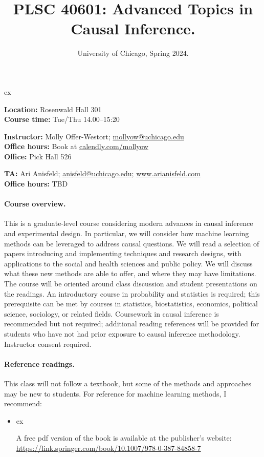 \documentclass[letterpaper, 12pt, parskip=full,DIV=10]{scrartcl}
\title{PLSC 40601: Advanced Topics in Causal Inference.}
\subtitle{University of Chicago, Spring 2024.}
\date{}
\author{}
\begin{document}
\maketitle

 ex

\textbf{Location:} Rosenwald Hall 301\\
\textbf{Course time:} Tue/Thu 14.00--15:20


\textbf{Instructor:} Molly Offer-Westort; \href{mailto:mollyow@uchicago.edu}{mollyow@uchicago.edu}\\
\textbf{Office hours:} Book at \href{https://calendly.com/mollyow}{calendly.com/mollyow}\\
\textbf{Office:} Pick Hall 526 

\textbf{TA:} Ari Anisfeld; \href{mailto:anisfeld@uchicago.edu}{anisfeld@uchicago.edu}; \href{http://www.arianisfeld.com/}{www.arianisfeld.com}\\
\textbf{Office hours:} TBD


\paragraph{Course overview.} This is a graduate-level course considering modern advances in causal inference and experimental design. In particular, we will consider how machine learning methods can be leveraged to address causal questions. We will read a selection of papers introducing and implementing techniques and research designs, with applications to the social and health sciences and public policy. We will discuss what these new methods are able to offer, and where they may have limitations. The course will be oriented around class discussion and student presentations on the readings. An introductory course in probability and statistics is required; this prerequisite can be met by courses in statistics, biostatistics, economics, political science, sociology, or related fields. Coursework in causal inference is recommended but not required; additional reading references will be provided for students who have not had prior exposure to causal inference methodology. Instructor consent required.


\paragraph{Reference readings.}
This class will not follow a textbook, but some of the methods and approaches may be new to students. For reference for machine learning methods, I recommend:
\begin{itemize}
\item {}  ex

A free pdf version of the book is available at the publisher's website: \url{https://link.springer.com/book/10.1007/978-0-387-84858-7}
\end{itemize}
\end{document}
